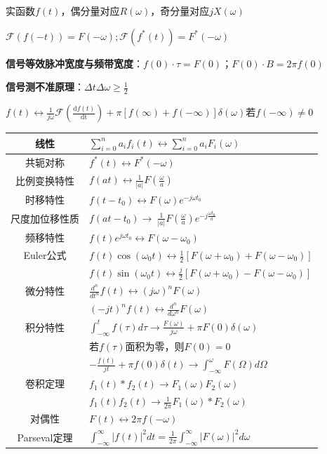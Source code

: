实函数$f(t)$，偶分量对应$R(\omega)$，奇分量对应$jX(\omega)$

$\mathcal{F}(f(-t))=F(-\omega);\mathcal{F}(f^*(t))=F^*(-\omega)$

\textbf{信号等效脉冲宽度与频带宽度}：$f(0)\cdot\tau=F(0)$；$F(0)\cdot B = 2\pi f(0)$

\textbf{信号测不准原理}：$\Delta t\Delta\omega \ge \frac{1}{2}$

$f(t) \leftrightarrow \frac{1}{j\omega} \mathcal{F}(\frac{\mathrm{d}f(t)}{\mathrm{dt}})+\pi[f(\infty) + f(-\infty)]\delta(\omega)$若$f(-\infty)\ne0$

\begin{center}
\begin{tabularx}{\columnwidth}{|c|X|}
\hline
线性 & $\sum_{i=0}^na_if_i(t)\leftrightarrow \sum_{i=0}^na_iF_i(\omega)$ \\
\hline
共轭对称 & $f^*(t) \leftrightarrow F^*(-\omega)$ \\
\hline
比例变换特性 & $f(at) \leftrightarrow \frac 1{|a|}F(\frac \omega a)$ \\
\hline
时移特性 & $f(t-t_0) \leftrightarrow F(\omega)e^{-j\omega t_0}$ \\
\hline
尺度加位移性质 & $f(at-t_0) \rightarrow\ \frac 1{|a|}F(\frac \omega a)e^{-j\frac {\omega t_0}a}$ \\
\hline
频移特性 & $f(t)e^{j\omega t_0} \leftrightarrow F(\omega-\omega_0)$ \\
\hline
Euler公式 & $f(t)\cos(\omega_0t)\!\leftrightarrow\!\frac{1}{2}[F(\omega\!+\!\omega_0)\!+\!F(\omega\!-\!\omega_0)]$\\
& $f(t)\sin(\omega_0t)\!\leftrightarrow\!\frac{j}{2}[F(\omega\!+\!\omega_0)\!-\!F(\omega\!-\!\omega_0)]$\\

\hline
微分特性 & $\frac {d^n}{dt^n}f(t) \leftrightarrow (j\omega)^nF(\omega)$ \\
& $(-jt)^nf(t) \leftrightarrow \frac {d^n}{d\omega^n}F(\omega)$ \\
\hline
积分特性 & $\int_{-\infty}^tf(\tau)d\tau \rightarrow \frac {F(\omega)}{j\omega}+\pi F(0)\delta(\omega)$ \\
& 若$f(\tau)$面积为零，则$F(0) = 0$ \\
& $-\frac {f(t)}{jt}+\pi f(0)\delta(t) \rightarrow \int_{-\infty}^{\omega}F(\Omega)d\Omega$ \\
\hline
卷积定理 & $f_1(t)*f_2(t) \rightarrow F_1(\omega)F_2(\omega)$ \\
& $f_1(t)f_2(t) \rightarrow \frac 1{2\pi}F_1(\omega)*F_2(\omega)$ \\
\hline
对偶性 & $F(t) \leftrightarrow 2\pi f(-\omega)$ \\
\hline
Parseval定理 & $\int ^{\infty} _{-\infty} |f(t)|^2 dt = \frac{1}{2\pi}\int ^{\infty} _{-\infty} |F(\omega)|^2 d\omega$ \\
\hline
\end{tabularx}
\end{center}

